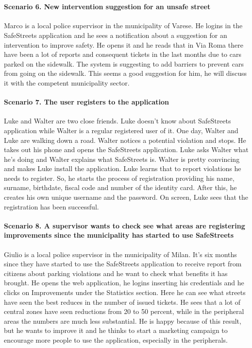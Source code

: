 \documentclass[a4paper]{report}
\begin{document}
\\ 
\\
\textbf{Scenario 6. New intervention suggestion for an unsafe street}\\
\\
Marco is a local police supervisor in the municipality of Varese. He logins in the SafeStreets application and he sees a notification about a suggestion for an intervention to improve safety. He opens it and he reads that in Via Roma there have been a lot of reports and consequent tickets in the last months due to cars parked on the sidewalk. The system is suggesting to add barriers to prevent cars from going on the sidewalk. This seems a good suggestion for him, he will discuss it with the competent municipality sector. 
\\
\\
\textbf{Scenario 7. The user registers to the application}\\
\\
Luke and Walter are two close friends. Luke doesn’t know about SafeStreets application while Walter is a regular registered user of it. One day, Walter and Luke are walking down a road. Walter notices a potential violation and stops. He takes out his phone and opens the SafeStreets application. Luke asks Walter what he’s doing and Walter explains what SafeStreets is. Walter is pretty convincing and makes Luke install the application. Luke learns that to report violations he needs to register. So, he starts the process of registration providing his name, surname, birthdate, fiscal code and number of the identity card. After this, he creates his own unique username and the password. On screen, Luke sees that the registration has been successful. 
\\
\\
\textbf{Scenario 8. A supervisor wants to check see what areas are registering improvements since the municipality has started to use SafeStreets}\\
\\
Giulio is a local police supervisor in the municipality of Milan. It’s six months since they have started to use the SafeStreets application to receive report from citizens about parking violations and he want to check what benefits it has brought. He opens the web application, he logins inserting his credentials and he clicks on Improvements under the Statistics section. Here he can see what streets have seen the best reduces in the number of issued tickets. He sees that a lot of central zones have seen reductions from 20 to 50 percent, while in the peripheral areas the numbers are much less substantial. He is happy because of this result, but he wants to improve it and he thinks to start a marketing campaign to encourage more people to use the application, especially in the peripherals. 
\end{document}
